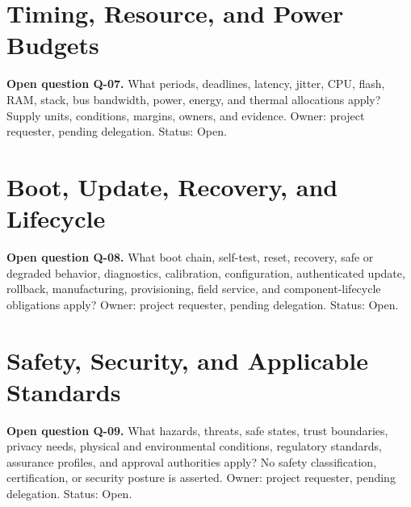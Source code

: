 \section{Timing, Resource, and Power Budgets}
\label{Question:Q-07}
\par\noindent\textbf{Open question Q-07.} What periods, deadlines, latency, jitter, CPU, flash, RAM, stack, bus bandwidth, power, energy, and thermal allocations apply? Supply units, conditions, margins, owners, and evidence. Owner: project requester, pending delegation. Status: Open.
\section{Boot, Update, Recovery, and Lifecycle}
\label{Question:Q-08}
\par\noindent\textbf{Open question Q-08.} What boot chain, self-test, reset, recovery, safe or degraded behavior, diagnostics, calibration, configuration, authenticated update, rollback, manufacturing, provisioning, field service, and component-lifecycle obligations apply? Owner: project requester, pending delegation. Status: Open.
\section{Safety, Security, and Applicable Standards}
\label{Question:Q-09}
\par\noindent\textbf{Open question Q-09.} What hazards, threats, safe states, trust boundaries, privacy needs, physical and environmental conditions, regulatory standards, assurance profiles, and approval authorities apply? No safety classification, certification, or security posture is asserted. Owner: project requester, pending delegation. Status: Open.

